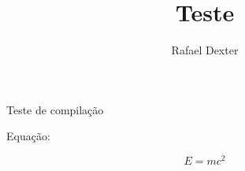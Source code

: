 \documentclass[10pt,a4paper]{article}
\author{Rafael Dexter}
\title{Teste}
\begin{document}
Teste de compilação

Equação:

\begin{equation}
E = m c^{2}
\end{equation}
\end{document}
